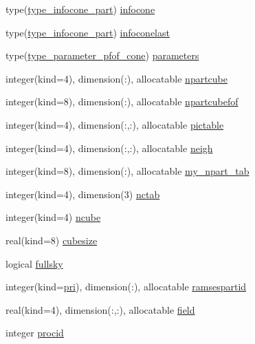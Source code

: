 \begin{DoxyCompactItemize}
type(\hyperlink{structmodconstant_1_1type__infocone__part}{type\+\_\+infocone\+\_\+part}) \hyperlink{namespacemodvariables_a9c451543a6252b72d4a5352333c718b9}{infocone}
\item 
type(\hyperlink{structmodconstant_1_1type__infocone__part}{type\+\_\+infocone\+\_\+part}) \hyperlink{namespacemodvariables_acecda25ec5fba6f5f5fcaa09b2aba3a2}{infoconelast}
\item 
type(\hyperlink{structmodconstant_1_1type__parameter__pfof__cone}{type\+\_\+parameter\+\_\+pfof\+\_\+cone}) \hyperlink{namespacemodvariables_a3a05eb7a0d11075c67b3f7c927170b48}{parameters}
\item 
integer(kind=4), dimension(\+:), allocatable \hyperlink{namespacemodvariables_a8cd49c574b692bbeae7029e8d138f58e}{npartcube}
\item 
integer(kind=8), dimension(\+:), allocatable \hyperlink{namespacemodvariables_a5e0afff3c4cb1ac79dd8ec2f3a7752d9}{npartcubefof}
\item 
integer(kind=4), dimension(\+:,\+:), allocatable \hyperlink{namespacemodvariables_aa09a585a04de1f8fba311a2f440db992}{pictable}
\item 
integer(kind=4), dimension(\+:,\+:), allocatable \hyperlink{namespacemodvariables_a8602ecbf617fcd3d1c712a4ace68843c}{neigh}
\item 
integer(kind=8), dimension(\+:), allocatable \hyperlink{namespacemodvariables_a64ba80f97884e73fedc7341570a93bd9}{my\+\_\+npart\+\_\+tab}
\item 
integer(kind=4), dimension(3) \hyperlink{namespacemodvariables_a0a00ccc148897945f3defb5f775e4c18}{nctab}
\item 
integer(kind=4) \hyperlink{namespacemodvariables_ab094334ab9c4ab8644017abf18dcd25f}{ncube}
\item 
real(kind=8) \hyperlink{namespacemodvariables_a12af092709e4d0b68394a217d16c4489}{cubesize}
\item 
logical \hyperlink{namespacemodvariables_ace518a722b9c63f8c88c4915aa9a7549}{fullsky}
\item 
integer(kind=\hyperlink{namespacemodvariables_a51e0b900e05f4302a36ddf33b6df0649}{pri}), dimension(\+:), allocatable \hyperlink{namespacemodvariables_aad55ee2cd6f458e86f0f8fa31339fac1}{ramsespartid}
\item 
real(kind=4), dimension(\+:,\+:), allocatable \hyperlink{namespacemodvariables_a07bff5345df2040ae2d0f7e6d67f9a5c}{field}
\item 
integer \hyperlink{namespacemodvariables_a27cda3ac7f6a8948a5f95e7dfa724167}{procid}

\end{DoxyCompactItemize}
